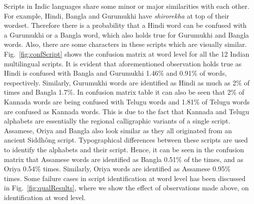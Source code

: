 Scripts in Indic languages share some minor or major similarities with each other. For example, Hindi, Bangla and Gurumukhi have \textit{shirorekha} at top of their wordset. Therefore there is a probability that a Hindi word can be confused with a Gurumukhi or a Bangla word, which also holds true for Gurumukhi and Bangla words. Also, there are some characters in these scripts which are visually similar. Fig.~\ref{fig:confScript} shows the confusion matrix at word level for all the 12 Indian multilingual scripts. It is evident that aforementioned observation holds true as Hindi is confused with Bangla and Gurumukhi 1.46\% and 0.91\% of words, respectively. Similarly, Gurumukhi words are identified as Hindi as much as 2\% of times and Bangla 1.7\%. In confusion matrix table it can also be seen that 2\% of Kannada words are being confused with Telugu words and 1.81\% of Telugu words are confused as Kannada words. This is due to the fact that Kannada and Telugu alphabets are essentially the regional calligraphic variants of a single script. Assamese, Oriya and Bangla also look similar as they all originated from an ancient Siddh\^{o}ng script. Typographical differences between these scripts are used to identify the alphabets and their script. Hence, it can be seen in the confusion matrix that Assamese words are identified as Bangla 0.51\% of the times, and as Oriya 0.54\% times. Similarly, Oriya words are identified as Assamese 0.95\% times. Some failure cases in script identification at word level has been discussed in Fig.~\ref{fig:qualResults}, where we show the effect of observations made above, on identification at word level.

